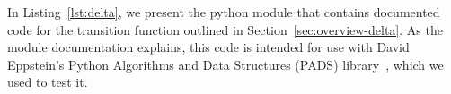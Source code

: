 \label{sec:implementation}

In Listing~\ref{lst:delta}, we present the python module that contains documented code for the transition function outlined in Section~\ref{sec:overview-delta}. As the module documentation explains, this code is intended for use with David Eppstein's Python Algorithms and Data Structures (PADS) library~\cite{eppstein:automata:www:2013}, which we used to test it.


